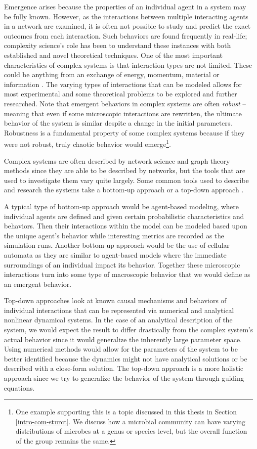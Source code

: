 Emergence arises because the properties of an individual agent in a system may be fully known. However, as the interactions between multiple interacting agents in a network are examined, it is often not possible to study and predict the exact outcomes from each interaction. Such behaviors are found frequently in real-life; complexity science's role has been to understand these instances with both established and novel theoretical techniques. One of the most important characteristics of complex systems is that interaction types are not limited. These could be anything from an exchange of energy, momentum, material or information \citep{Werner1999}. The varying types of interactions that can be modeled allows for most experimental and some theoretical problems to be explored and further researched. Note that emergent behaviors in complex systems are often \textit{robust} -- meaning that even if some microscopic interactions are rewritten, the ultimate behavior of the system is similar despite a change in the initial parameters. Robustness is a fundamental property of some complex systems because if they were not robust, truly chaotic behavior would emerge\footnote{One example supporting this is a topic discussed in this thesis in Section \ref{intro-com-sturct}. We discuss how a microbial community can have varying distributions of microbes at a genus or species level, but the overall function of the group remains the same.}. 

Complex systems are often described by network science and graph theory methods since they are able to be described by networks, but the tools that are used to investigate them vary quite largely. Some common tools used to describe and research the systems take a bottom-up approach or a top-down approach \citep{Mhamdi2018}. 

A typical type of bottom-up approach would be agent-based modeling, where individual agents are defined and given certain probabilistic characteristics and behaviors. Then their interactions within the model can be modeled based upon the unique agent's behavior while interesting metrics are recorded as the simulation runs. Another bottom-up approach would be the use of cellular automata as they are similar to agent-based models where the immediate surroundings of an individual impact its behavior. Together these microscopic interactions turn into some type of macroscopic behavior that we would define as an emergent behavior.

Top-down approaches look at known causal mechanisms and behaviors of individual interactions that can be represented via numerical and analytical nonlinear dynamical systems. In the case of an analytical description of the system, we would expect the result to differ drastically from the complex system's actual behavior since it would generalize the inherently large parameter space. Using numerical methods would allow for the parameters of the system to be better identified because the dynamics might not have analytical solutions or be described with a close-form solution. The top-down approach is a more holistic approach since we try to generalize the behavior of the system through guiding equations.



